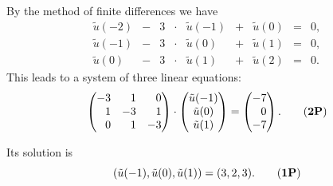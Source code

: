 \begin{loesung}
\begin{teilaufgaben}
\item
By the method of finite differences we have
\begin{equation*}
\renewcommand{\arraycolsep}{2.4pt}
\begin{array}{lcrclclcl}
\tilde u(-2) &-& 3 &\cdot& \tilde u(-1) &+& \tilde u(0) &=& 0, \\
\tilde u(-1) &-& 3 &\cdot& \tilde u(0)  &+& \tilde u(1) &=& 0, \\
\tilde u(0)  &-& 3 &\cdot& \tilde u(1)  &+& \tilde u(2) &=& 0.
\end{array}
\end{equation*}
This leads to a system of three linear equations:
\begin{equation}
\begin{pmatrix*}[r]
-3 & 1 & 0 \\
 1 & -3 & 1\\
 0 & 1 & -3
\end{pmatrix*}
\cdot
\begin{pmatrix}
\tilde u(-1)  \\
  \tilde u(0) \\
\tilde u(1)
\end{pmatrix}
=
\begin{pmatrix*}[r]
-7  \\
 0 \\
-7
\end{pmatrix*}.
\tag{\textbf{2P}}
\end{equation}

Its solution is
\begin{equation}
(\tilde u(-1),  \tilde u(0), \tilde u(1)) = (3 , 2, 3).
\tag{\textbf{1P}}
\end{equation}


\end{teilaufgaben}
\end{loesung}
